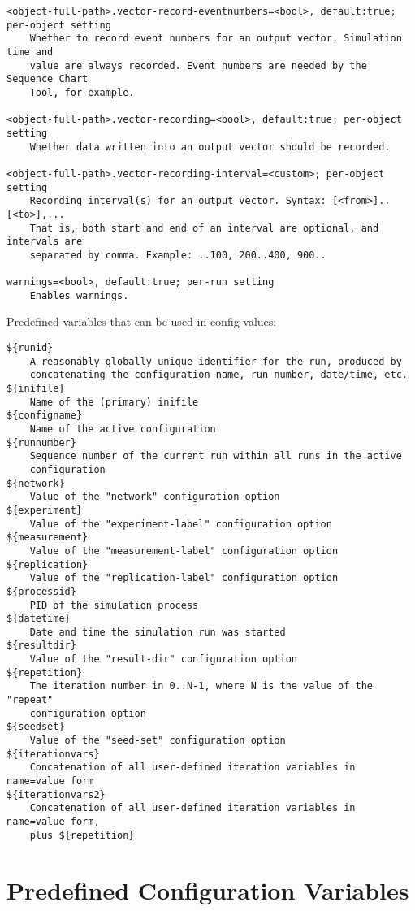 \begin{verbatim}
<object-full-path>.vector-record-eventnumbers=<bool>, default:true; per-object setting
    Whether to record event numbers for an output vector. Simulation time and
    value are always recorded. Event numbers are needed by the Sequence Chart
    Tool, for example.

<object-full-path>.vector-recording=<bool>, default:true; per-object setting
    Whether data written into an output vector should be recorded.

<object-full-path>.vector-recording-interval=<custom>; per-object setting
    Recording interval(s) for an output vector. Syntax: [<from>]..[<to>],...
    That is, both start and end of an interval are optional, and intervals are
    separated by comma. Example: ..100, 200..400, 900..

warnings=<bool>, default:true; per-run setting
    Enables warnings.
\end{verbatim}


Predefined variables that can be used in config values:

\begin{verbatim}
${runid}
    A reasonably globally unique identifier for the run, produced by
    concatenating the configuration name, run number, date/time, etc.
${inifile}
    Name of the (primary) inifile
${configname}
    Name of the active configuration
${runnumber}
    Sequence number of the current run within all runs in the active
    configuration
${network}
    Value of the "network" configuration option
${experiment}
    Value of the "experiment-label" configuration option
${measurement}
    Value of the "measurement-label" configuration option
${replication}
    Value of the "replication-label" configuration option
${processid}
    PID of the simulation process
${datetime}
    Date and time the simulation run was started
${resultdir}
    Value of the "result-dir" configuration option
${repetition}
    The iteration number in 0..N-1, where N is the value of the "repeat"
    configuration option
${seedset}
    Value of the "seed-set" configuration option
${iterationvars}
    Concatenation of all user-defined iteration variables in name=value form
${iterationvars2}
    Concatenation of all user-defined iteration variables in name=value form,
    plus ${repetition}
\end{verbatim}



\section{Predefined Configuration Variables}

